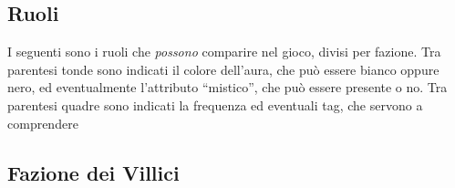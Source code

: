 \documentclass[a4paper,10pt]{article}
\begin{document}
\subsection{Ruoli}
\label{ruoli}


I seguenti sono i ruoli che \emph{possono} comparire nel gioco, divisi per fazione. Tra parentesi tonde sono indicati il colore dell'aura, che può essere bianco oppure nero, ed eventualmente l'attributo ``mistico'', che può essere presente o no. Tra parentesi quadre sono indicati la frequenza ed eventuali tag, che servono a comprendere

\subsection*{Fazione dei Villici}
\end{document}
